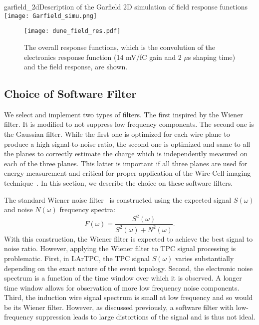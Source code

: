 \begin{cdrfigure}{garfield_2d}{Description of the Garfield 2D simulation of field response functions}
  \texttt{[image: Garfield\_simu.png]}
\end{cdrfigure}


\begin{figure}[htb]
\centering
\texttt{[image: dune\_field\_res.pdf]}
\caption{The overall response functions, which is the convolution of the
electronics response function (14 mV/fC gain and 2 $\mu$s shaping time) 
and the field response, are shown. }
\label{fig:overall_response}
\end{figure}


\subsection{Choice of Software Filter}

We select and implement two types of filters.  The first inspired by the Wiener filter.  It is modified to not suppress
low frequency components.  The second one is the Gaussian filter. While the first one is optimized for 
each wire plane to produce a high signal-to-noise ratio, the second one is optimized and same to all the planes 
to correctly estimate the charge which is independently measured on each of the three planes.  This latter is 
important if all three planes are used for energy measurement and critical for proper application of the
Wire-Cell imaging technique~\cite{wire-cell}.  In this section, we describe the choice on these software filters.

The standard Wiener noise filter~\cite{wiener} is constructed using the expected 
signal $S(\omega)$ and noise $N(\omega)$ frequency spectra:
\begin{equation}
F(\omega) = \frac{S^2(\omega)}{S^2(\omega) + N^2(\omega)}.
\end{equation}
With this construction, the Wiener filter is expected to achieve the best signal to noise ratio. 
However, applying the Wiener filter to TPC signal processing is problematic. 
%
First, in LArTPC, the TPC signal $S(\omega)$ varies substantially
depending on the exact nature of the event topology.
%
Second, the electronic noise spectrum is a function of the time window
over which it is observed. A longer time window allows for observation
of more low frequency noise components.
%
Third, the induction wire signal spectrum is small at low frequency
and so would be its Wiener filter.  However, as discussed previously, 
a software filter with low-frequency suppression leads to large distortions 
of the signal and is thus not ideal.  

